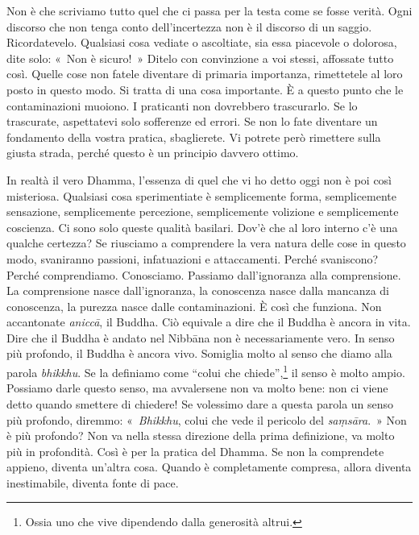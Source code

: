 Non è che scriviamo tutto quel che ci passa per la testa come se fosse
verità. Ogni discorso che non tenga conto dell'incertezza non è il
discorso di un saggio. Ricordatevelo. Qualsiasi cosa vediate o
ascoltiate, sia essa piacevole o dolorosa, dite solo: «~Non è sicuro!~»
Ditelo con convinzione a voi stessi, affossate tutto così. Quelle cose
non fatele diventare di primaria importanza, rimettetele al loro posto
in questo modo. Si tratta di una cosa importante. È a questo punto che
le contaminazioni muoiono. I praticanti non dovrebbero trascurarlo. Se
lo trascurate, aspettatevi solo sofferenze ed errori. Se non lo fate
diventare un fondamento della vostra pratica, sbaglierete. Vi potrete
però rimettere sulla giusta strada, perché questo è un principio davvero
ottimo.

In realtà il vero Dhamma, l'essenza di quel che vi ho detto oggi non è
poi così misteriosa. Qualsiasi cosa sperimentiate è semplicemente forma,
semplicemente sensazione, semplicemente percezione, semplicemente
volizione e semplicemente coscienza. Ci sono solo queste qualità
basilari. Dov'è che al loro interno c'è una qualche certezza? Se
riusciamo a comprendere la vera natura delle cose in questo modo,
svaniranno passioni, infatuazioni e attaccamenti. Perché svaniscono?
Perché comprendiamo. Conosciamo. Passiamo dall'ignoranza alla
comprensione. La comprensione nasce dall'ignoranza, la conoscenza nasce
dalla mancanza di conoscenza, la purezza nasce dalle contaminazioni. È
così che funziona. Non accantonate \emph{aniccā}, il Buddha. Ciò
equivale a dire che il Buddha è ancora in vita. Dire che il Buddha è
andato nel Nibbāna non è necessariamente vero. In senso più
profondo, il Buddha è ancora vivo. Somiglia molto al senso che diamo
alla parola \emph{bhikkhu}. Se la definiamo come ``colui che
chiede'',\footnote{Ossia uno che vive dipendendo dalla generosità
  altrui.} il senso è molto ampio. Possiamo darle questo senso, ma
avvalersene non va molto bene: non ci viene detto quando smettere di
chiedere! Se volessimo dare a questa parola un senso più profondo,
diremmo: «~\emph{Bhikkhu}, colui che vede il pericolo del
\emph{saṃsāra}.~» Non è più profondo? Non va nella stessa direzione
della prima definizione, va molto più in profondità. Così è per la
pratica del Dhamma. Se non la comprendete appieno, diventa un'altra
cosa. Quando è completamente compresa, allora diventa inestimabile,
diventa fonte di pace.

